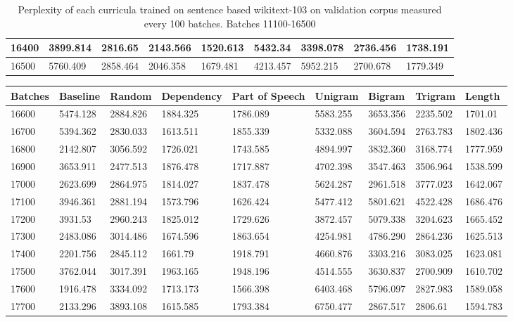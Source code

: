 \documentclass [11pt, proquest] {uwthesis}[2020/12/20]
\begin{document}
\begin{table}[]
\begin{tiny}
\begin{tabular}{|l|l|l|l|l|l|l|l|l|}
16400 & 3899.814 & 2816.65 & 2143.566 & 1520.613 & 5432.34 & 3398.078 & 2736.456 & 1738.191 \\ \hline
16500 & 5760.409 & 2858.464 & 2046.358 & 1679.481 & 4213.457 & 5952.215 & 2700.678 & 1779.349 \\ \hline
\end{tabular}
\end{tiny}
\caption{Perplexity of each curricula trained on sentence based wikitext-103 on validation corpus measured every 100 batches. Batches 11100-16500}
\label{tab:wikitext-103-sentence-3}
\end{table}
\begin{table}[]
\centering
\begin{tiny}
\begin{tabular}{|l|l|l|l|l|l|l|l|l|}
\hline
Batches & Baseline & Random & Dependency & Part of Speech & Unigram & Bigram & Trigram & Length \\ \hline
16600 & 5474.128 & 2884.826 & 1884.325 & 1786.089 & 5583.255 & 3653.356 & 2235.502 & 1701.01 \\ \hline
16700 & 5394.362 & 2830.033 & 1613.511 & 1855.339 & 5332.088 & 3604.594 & 2763.783 & 1802.436 \\ \hline
16800 & 2142.807 & 3056.592 & 1726.021 & 1743.585 & 4894.997 & 3832.360 & 3168.774 & 1777.959 \\ \hline
16900 & 3653.911 & 2477.513 & 1876.478 & 1717.887 & 4702.398 & 3547.463 & 3506.964 & 1538.599 \\ \hline
17000 & 2623.699 & 2864.975 & 1814.027 & 1837.478 & 5624.287 & 2961.518 & 3777.023 & 1642.067 \\ \hline
17100 & 3946.361 & 2881.194 & 1573.796 & 1626.424 & 5477.412 & 5801.621 & 4522.428 & 1686.476 \\ \hline
17200 & 3931.53 & 2960.243 & 1825.012 & 1729.626 & 3872.457 & 5079.338 & 3204.623 & 1665.452 \\ \hline
17300 & 2483.086 & 3014.486 & 1674.596 & 1863.654 & 4254.981 & 4786.290 & 2864.236 & 1625.513 \\ \hline
17400 & 2201.756 & 2845.112 & 1661.79 & 1918.791 & 4660.876 & 3303.216 & 3083.025 & 1623.081 \\ \hline
17500 & 3762.044 & 3017.391 & 1963.165 & 1948.196 & 4514.555 & 3630.837 & 2700.909 & 1610.702 \\ \hline
17600 & 1916.478 & 3334.092 & 1713.173 & 1566.398 & 6403.468 & 5796.097 & 2827.983 & 1589.058 \\ \hline
17700 & 2133.296 & 3893.108 & 1615.585 & 1793.384 & 6750.477 & 2867.517 & 2806.61 & 1594.783 \\ \hline

\end{tabular}
\end{tiny}
\end{table}
\end{document}
